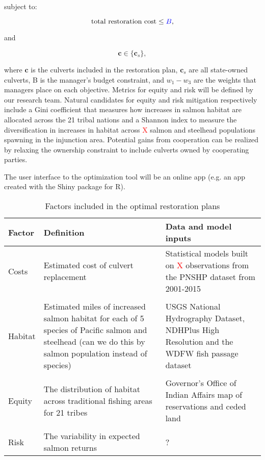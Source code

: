 \documentclass[12pt]{elsarticle}
\begin{document}
\noindent subject to:

\begin{equation*}
\text{total restoration cost} \le \textcolor{blue}{B},
\end{equation*}

\noindent and

\begin{equation*}
\boldsymbol{c} \in \{\boldsymbol{c}_s  \},
\end{equation*}

where $\boldsymbol{c}$ is the culverts included in the restoration plan, $\boldsymbol{c}_s$ are all state-owned culverts, B is the manager's budget constraint, and $w_1-w_3$ are the weights that managers place on each objective. Metrics for equity and risk will be defined by our research team. Natural candidates for equity and risk mitigation respectively include a Gini coefficient that measures how increases in salmon habitat are allocated across the 21 tribal nations and a Shannon index to measure the diversification in increases in habitat across \textcolor{red}{X} salmon and steelhead populations spawning in the injunction area. Potential gains from cooperation can be realized by relaxing the ownership constraint to include culverts owned by cooperating parties.

The user interface to the optimization tool will be an online app (e.g. an app created with the Shiny package for R).


\begin{table}[htbp]
  \centering
  \caption{Factors included in the optimal restoration plans}
    \begin{tabular}{llp{18.835em}}\hline
    \textbf{Factor} & \textbf{Definition} & \multicolumn{1}{l}{\textbf{Data and model inputs}} \\\hline
    Costs & Estimated cost of culvert replacement & Statistical models built on \textcolor{red}{X} observations from the PNSHP dataset from 2001-2015 \\
& &\\
    Habitat & \multicolumn{1}{p{17.335em}}{Estimated miles of increased salmon habitat for each of 5 species of Pacific salmon and steelhead (can we do this by salmon population instead of species)} & USGS National Hydrography Dataset, NDHPlus High Resolution and the WDFW fish passage dataset \\
& &\\
    Equity & \multicolumn{1}{p{17.335em}}{The distribution of habitat across traditional fishing areas for 21 tribes} & Governor's Office of Indian Affairs map of reservations and ceded land \\
& &\\
    Risk  & The variability in expected salmon returns & ? \\\hline
    \end{tabular}%
  \label{tab:factors}%
\end{table}%
\end{document}
